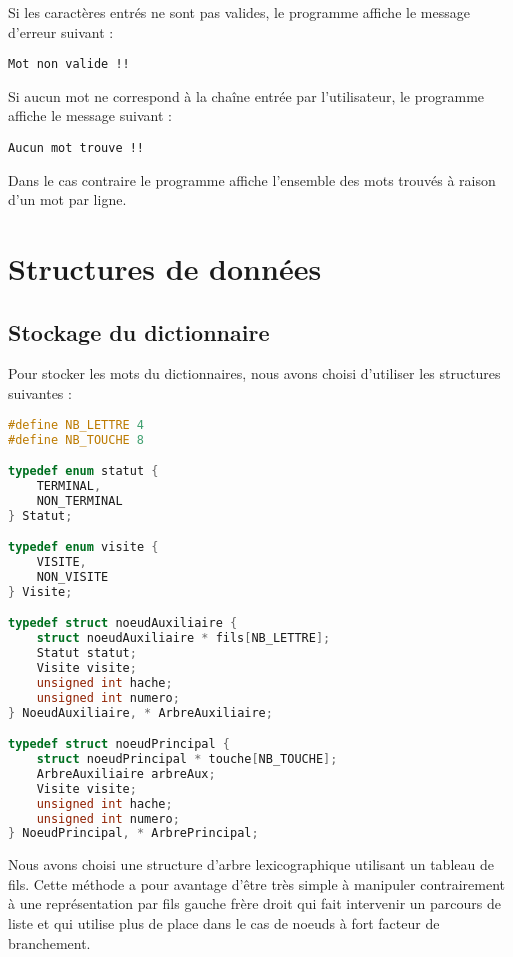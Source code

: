 \documentclass[15pt, a4paper]{article}
\begin{document}
\noindent Si les caractères entrés ne sont pas valides, le programme affiche le message d'erreur suivant :

\begin{verbatim}
Mot non valide !!
\end{verbatim}

\noindent Si aucun mot ne correspond à la chaîne entrée par l'utilisateur, le programme affiche le message suivant :

\begin{verbatim}
Aucun mot trouve !!
\end{verbatim}

\noindent Dans le cas contraire le programme affiche l'ensemble des mots trouvés à raison d'un mot par ligne.

\section{Structures de données}

\subsection{Stockage du dictionnaire}

\noindent Pour stocker les mots du dictionnaires, nous avons choisi d'utiliser les structures suivantes : 

\begin{lstlisting}[language=c]
#define NB_LETTRE 4
#define NB_TOUCHE 8

typedef enum statut {
    TERMINAL,
    NON_TERMINAL
} Statut;

typedef enum visite {
    VISITE,
    NON_VISITE
} Visite;

typedef struct noeudAuxiliaire {
    struct noeudAuxiliaire * fils[NB_LETTRE];
    Statut statut;
    Visite visite;
    unsigned int hache;
    unsigned int numero;
} NoeudAuxiliaire, * ArbreAuxiliaire;

typedef struct noeudPrincipal {
    struct noeudPrincipal * touche[NB_TOUCHE];
    ArbreAuxiliaire arbreAux;
    Visite visite;
    unsigned int hache;
    unsigned int numero;
} NoeudPrincipal, * ArbrePrincipal;
\end{lstlisting}

Nous avons choisi une structure d'arbre lexicographique utilisant un tableau de fils. Cette méthode a pour 
avantage d'être très simple à manipuler contrairement à une représentation par fils gauche frère droit
qui fait intervenir un parcours de liste et qui utilise plus de place dans le cas de noeuds à fort facteur
de branchement.
\end{document}
